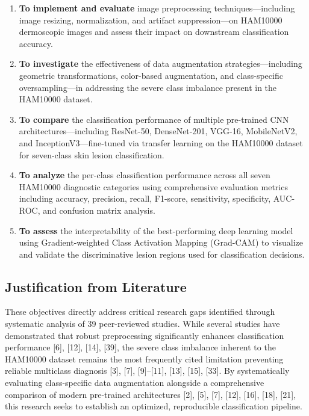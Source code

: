 \documentclass[11pt,a4paper]{article}
\begin{document}
\begin{enumerate}[label=\textbf{\arabic*.}, leftmargin=*, itemsep=8pt]

\item \textbf{To implement and evaluate} image preprocessing techniques---including image resizing, normalization, and artifact suppression---on HAM10000 dermoscopic images and assess their impact on downstream classification accuracy.

\item \textbf{To investigate} the effectiveness of data augmentation strategies---including geometric transformations, color-based augmentation, and class-specific oversampling---in addressing the severe class imbalance present in the HAM10000 dataset.

\item \textbf{To compare} the classification performance of multiple pre-trained CNN architectures---including ResNet-50, DenseNet-201, VGG-16, MobileNetV2, and InceptionV3---fine-tuned via transfer learning on the HAM10000 dataset for seven-class skin lesion classification.

\item \textbf{To analyze} the per-class classification performance across all seven HAM10000 diagnostic categories using comprehensive evaluation metrics including accuracy, precision, recall, F1-score, sensitivity, specificity, AUC-ROC, and confusion matrix analysis.

\item \textbf{To assess} the interpretability of the best-performing deep learning model using Gradient-weighted Class Activation Mapping (Grad-CAM) to visualize and validate the discriminative lesion regions used for classification decisions.

\end{enumerate}

\subsection*{Justification from Literature}

These objectives directly address critical research gaps identified through systematic analysis of 39 peer-reviewed studies. While several studies have demonstrated that robust preprocessing significantly enhances classification performance [6], [12], [14], [39], the severe class imbalance inherent to the HAM10000 dataset remains the most frequently cited limitation preventing reliable multiclass diagnosis [3], [7], [9]--[11], [13], [15], [33]. By systematically evaluating class-specific data augmentation alongside a comprehensive comparison of modern pre-trained architectures [2], [5], [7], [12], [16], [18], [21], this research seeks to establish an optimized, reproducible classification pipeline.
\end{document}
